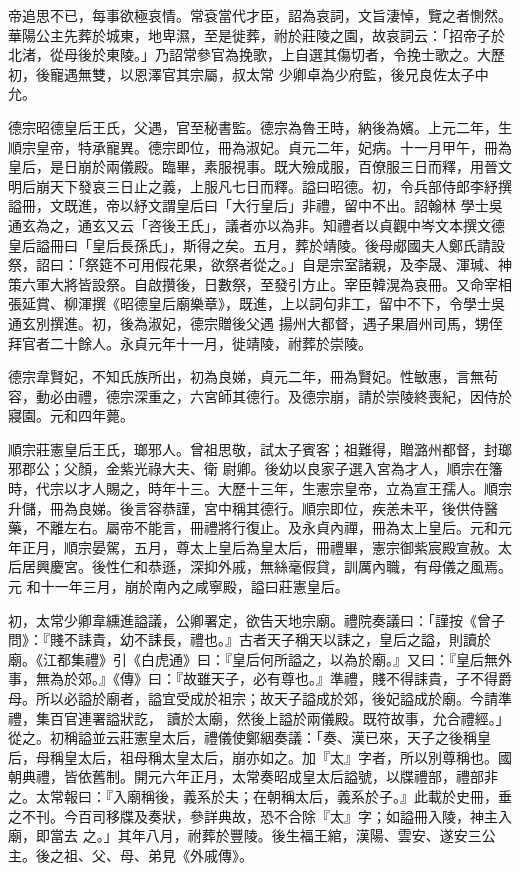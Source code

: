 \begin{pinyinscope}
 帝追思不已，每事欲極哀情。常袞當代才臣，詔為哀詞，文旨淒悼，覽之者惻然。華陽公主先葬於城東，地卑濕，至是徙葬，祔於莊陵之園，故哀詞云：「招帝子於北渚，從母後於東陵。」乃詔常參官為挽歌，上自選其傷切者，令挽士歌之。大歷初，後寵遇無雙，以恩澤官其宗屬，叔太常
 少卿卓為少府監，後兄良佐太子中允。



 德宗昭德皇后王氏，父遇，官至秘書監。德宗為魯王時，納後為嬪。上元二年，生順宗皇帝，特承寵異。德宗即位，冊為淑妃。貞元二年，妃病。十一月甲午，冊為皇后，是日崩於兩儀殿。臨畢，素服視事。既大殮成服，百僚服三日而釋，用晉文明后崩天下發哀三日止之義，上服凡七日而釋。謚曰昭德。初，令兵部侍郎李紓撰謚冊，文既進，帝以紓文謂皇后曰「大行皇后」非禮，留中不出。詔翰林
 學士吳通玄為之，通玄又云「咨後王氏」，議者亦以為非。知禮者以貞觀中岑文本撰文德皇后謚冊曰「皇后長孫氏」，斯得之矣。五月，葬於靖陵。後母郕國夫人鄭氏請設祭，詔曰：「祭筵不可用假花果，欲祭者從之。」自是宗室諸親，及李晟、渾瑊、神策六軍大將皆設祭。自啟攢後，日數祭，至發引方止。宰臣韓滉為哀冊。又命宰相張延賞、柳渾撰《昭德皇后廟樂章》，既進，上以詞句非工，留中不下，令學士吳通玄別撰進。初，後為淑妃，德宗贈後父遇
 揚州大都督，遇子果眉州司馬，甥侄拜官者二十餘人。永貞元年十一月，徙靖陵，祔葬於崇陵。



 德宗韋賢妃，不知氏族所出，初為良娣，貞元二年，冊為賢妃。性敏惠，言無茍容，動必由禮，德宗深重之，六宮師其德行。及德宗崩，請於崇陵終喪紀，因侍於寢園。元和四年薨。



 順宗莊憲皇后王氏，瑯邪人。曾祖思敬，試太子賓客；祖難得，贈潞州都督，封瑯邪郡公；父顏，金紫光祿大夫、衛
 尉卿。後幼以良家子選入宮為才人，順宗在籓時，代宗以才人賜之，時年十三。大歷十三年，生憲宗皇帝，立為宣王孺人。順宗升儲，冊為良娣。後言容恭謹，宮中稱其德行。順宗即位，疾恙未平，後供侍醫藥，不離左右。屬帝不能言，冊禮將行復止。及永貞內禪，冊為太上皇后。元和元年正月，順宗晏駕，五月，尊太上皇后為皇太后，冊禮畢，憲宗御紫宸殿宣赦。太后居興慶宮。後性仁和恭遜，深抑外戚，無絲毫假貸，訓厲內職，有母儀之風焉。元
 和十一年三月，崩於南內之咸寧殿，謚曰莊憲皇后。



 初，太常少卿韋纁進謚議，公卿署定，欲告天地宗廟。禮院奏議曰：「謹按《曾子問》：『賤不誄貴，幼不誄長，禮也。』古者天子稱天以誄之，皇后之謚，則讀於廟。《江都集禮》引《白虎通》曰：『皇后何所謚之，以為於廟。』又曰：『皇后無外事，無為於郊。』《傳》曰：『故雖天子，必有尊也。』準禮，賤不得誄貴，子不得爵母。所以必謚於廟者，謚宜受成於祖宗；故天子謚成於郊，後妃謚成於廟。今請準禮，集百官連署謚狀訖，
 讀於太廟，然後上謚於兩儀殿。既符故事，允合禮經。」從之。初稱謚並云莊憲皇太后，禮儀使鄭絪奏議：「奏、漢已來，天子之後稱皇后，母稱皇太后，祖母稱太皇太后，崩亦如之。加『太』字者，所以別尊稱也。國朝典禮，皆依舊制。開元六年正月，太常奏昭成皇太后謚號，以牒禮部，禮部非之。太常報曰：『入廟稱後，義系於夫；在朝稱太后，義系於子。』此載於史冊，垂之不刊。今百司移牒及奏狀，參詳典故，恐不合除『太』字；如謚冊入陵，神主入廟，即當去
 之。」其年八月，祔葬於豐陵。後生福王綰，漢陽、雲安、遂安三公主。後之祖、父、母、弟見《外戚傳》。




\end{pinyinscope}

